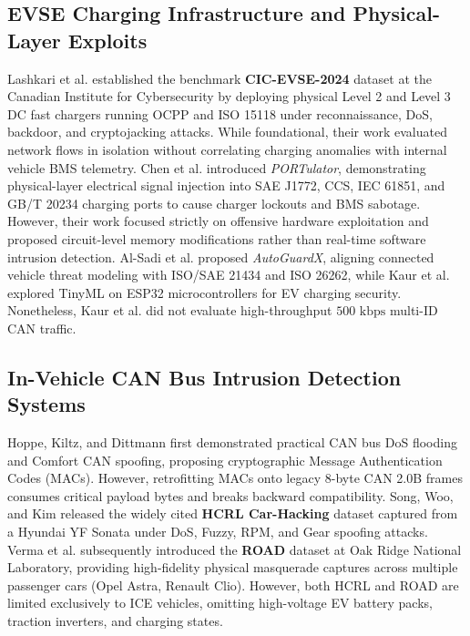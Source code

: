 \documentclass[conference]{IEEEtran}
\begin{document}
\subsection{EVSE Charging Infrastructure and Physical-Layer Exploits}
Lashkari et al. \cite{lashkari2024} established the benchmark \textbf{CIC-EVSE-2024} dataset at the Canadian Institute for Cybersecurity by deploying physical Level 2 and Level 3 DC fast chargers running OCPP and ISO 15118 under reconnaissance, DoS, backdoor, and cryptojacking attacks. While foundational, their work evaluated network flows in isolation without correlating charging anomalies with internal vehicle BMS telemetry. Chen et al. \cite{chen2025} introduced \textit{PORTulator}, demonstrating physical-layer electrical signal injection into SAE J1772, CCS, IEC 61851, and GB/T 20234 charging ports to cause charger lockouts and BMS sabotage. However, their work focused strictly on offensive hardware exploitation and proposed circuit-level memory modifications rather than real-time software intrusion detection. Al-Sadi et al. \cite{alsadi2025} proposed \textit{AutoGuardX}, aligning connected vehicle threat modeling with ISO/SAE 21434 and ISO 26262, while Kaur et al. \cite{kaur2024} explored TinyML on ESP32 microcontrollers for EV charging security. Nonetheless, Kaur et al. did not evaluate high-throughput $500\text{ kbps}$ multi-ID CAN traffic.

\subsection{In-Vehicle CAN Bus Intrusion Detection Systems}
Hoppe, Kiltz, and Dittmann \cite{hoppe2008} first demonstrated practical CAN bus DoS flooding and Comfort CAN spoofing, proposing cryptographic Message Authentication Codes (MACs). However, retrofitting MACs onto legacy 8-byte CAN 2.0B frames consumes critical payload bytes and breaks backward compatibility. Song, Woo, and Kim \cite{song2020} released the widely cited \textbf{HCRL Car-Hacking} dataset captured from a Hyundai YF Sonata under DoS, Fuzzy, RPM, and Gear spoofing attacks. Verma et al. \cite{verma2021} subsequently introduced the \textbf{ROAD} dataset at Oak Ridge National Laboratory, providing high-fidelity physical masquerade captures across multiple passenger cars (Opel Astra, Renault Clio). However, both HCRL and ROAD are limited exclusively to ICE vehicles, omitting high-voltage EV battery packs, traction inverters, and charging states.
\end{document}
